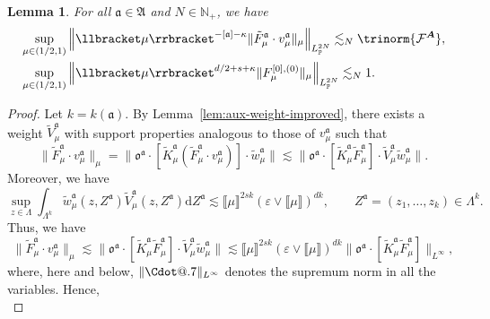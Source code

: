 \documentclass{article}
\makeatletter
\numberwithin{equation}{section}
\newcommand{\mathd}{\mathrm{d}}
\newcommand*\Cdot{{\mathpalette\Cdot@{.7}}}
\newcommand*\Cdot@[2]{\mathbin{\vcenter{\hbox{\scalebox{#2}{\hspace{0.1mm}$\m@th#1\bullet$\hspace{0.1mm}}}}}}
\theoremstyle{plain}
\newtheorem{lemma}[theorem]{Lemma}
\theoremstyle{definition}
\makeatother
\begin{document}
\begin{lemma}
  \label{lem:v-and-K}For all $\mathfrak{a} \in \mathfrak{A}$ and $N \in
  \mathbb{N}_+$, we have
  \begin{align*}
    & \sup_{\mu \in (1 / 2, 1)} \left\| \llbracket \mu \rrbracket^{-
    [\mathfrak{a}] - \kappa} \| \tilde{F}^{\mathfrak{a}}_{\mu} \cdot
    v^{\mathfrak{a}}_{\mu} \|_{\mu} \right\|_{L^{2 N}_{\mathbb{P}}} \lesssim_N
    \trinorm{ \mathcal{F}^{\boldsymbol{A}} }, \\
    & \sup_{\mu \in (1 / 2, 1)} \left\| \llbracket \mu
    \rrbracket^{d / 2 + s + \kappa}  \| F^{[0], (0)}_{\mu} \|_{\mu}
    \right\|_{L^{2 N}_{\mathbb{P}}} \lesssim_N 1. 
  \end{align*}
\end{lemma}

\begin{proof}
  Let $k = k (\mathfrak{a})$. By Lemma~\ref{lem:aux-weight-improved}, there exists a
  weight $\tilde{V}^{\mathfrak{a}}_{\mu}$ with support properties analogous to
  those of $v^{\mathfrak{a}}_{\mu}$ such that
  \[ \| \tilde{F}^{\mathfrak{a}}_{ \mu} \cdot v^{\mathfrak{a}}_{\mu} \|_{\mu}
     = \| \mathfrak{o}^{\mathfrak{a}} \cdot [\tilde{K}^{\mathfrak{a}}_{\mu}
     (\tilde{F}^{\mathfrak{a}}_{ \mu} \cdot v^{\mathfrak{a}}_{\mu})] \cdot
     \tilde{w}^{\mathfrak{a}}_{\mu} \| \lesssim  \|
     \mathfrak{o}^{\mathfrak{a}} \cdot [\tilde{K}^{\mathfrak{a}}_{\mu}
     \tilde{F}_{\mu}^{\mathfrak{a}}] \cdot \tilde{V}^{\mathfrak{a}}_{\mu}
     \tilde{w}^{\mathfrak{a}}_{\mu} \| . \]
  Moreover, we have
  \[ \sup_{z \in \Lambda} \int_{\Lambda^k}  \tilde{w}^{\mathfrak{a}}_{\mu} (z,
     Z^{\mathfrak{a}}) \tilde{V}^{\mathfrak{a}}_{\mu} (z, Z^{\mathfrak{a}}) 
     \textrm{} \mathd Z^{\mathfrak{a}} \lesssim \llbracket \mu
     \rrbracket^{2 s k}  (\varepsilon \vee \llbracket \mu \rrbracket)^{d k},
     \qquad Z^{\mathfrak{a}} = (z_1, \ldots, z_k) \in \Lambda^k . \]
  Thus, we have
  \[ \| \tilde{F}^{\mathfrak{a}}_{ \mu} \cdot v^{\mathfrak{a}}_{\mu} \|_{\mu}
     \lesssim \| \mathfrak{o}^{\mathfrak{a}} \cdot
     [\tilde{K}^{\mathfrak{a}}_{\mu} \tilde{F}_{\mu}^{\mathfrak{a}}] \cdot
     \tilde{V}^{\mathfrak{a}}_{\mu} \tilde{w}^{\mathfrak{a}}_{\mu} \| \lesssim
     \llbracket \mu \rrbracket^{2 s k}  (\varepsilon \vee
     \llbracket \mu \rrbracket)^{d k}  \| \mathfrak{o}^{\mathfrak{a}} \cdot
     [\tilde{K}^{\mathfrak{a}}_{\mu} \tilde{F}_{\mu}^{\mathfrak{a}}]
     \|_{L^{\infty}}, \]
  where, here and below, $\| \Cdot \|_{L^{\infty}}$ denotes the supremum
  norm in all the variables. Hence,
  \begin{equation}

\end{equation}
\end{proof}
\end{document}
